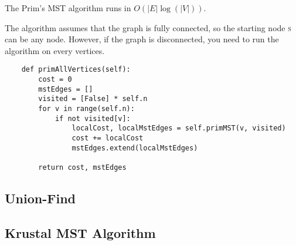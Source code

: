 \noindent The Prim's MST algorithm runs in $O(|E| \log (|V|))$.

\noindent The algorithm assumes that the graph is fully connected, so the starting node \textsc{s} can be any node.
However, if the graph is disconnected, you need to run the algorithm on every vertices.

\begin{verbatim}
    def primAllVertices(self):
        cost = 0
        mstEdges = []
        visited = [False] * self.n
        for v in range(self.n):
            if not visited[v]:
                localCost, localMstEdges = self.primMST(v, visited)
                cost += localCost
                mstEdges.extend(localMstEdges)

        return cost, mstEdges
\end{verbatim}

\subsection{Union-Find}

\subsection{Krustal MST Algorithm}

